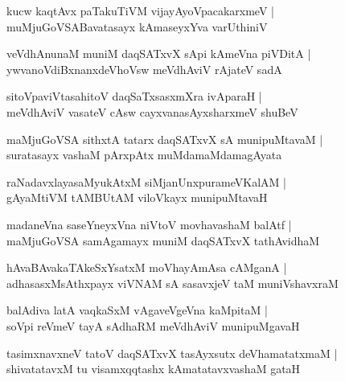 \documentclass[twoside,12pt,openright]{book}
\newcounter{shloka}[chapter]
\begin{document}
\begin{shloka}%
kucw kaqtAvx paTakuTiVM vijayAyoVpacakarxmeV |\\
muMjuGoVSABavatasayx kAmaseyxYva varUthiniV 
\end{shloka}

\begin{shloka}%
veVdhAnunaM muniM daqSATxvX sApi kAmeVna piVDitA |\\
ywvanoVdiBxnanxdeVhoVsw meVdhAviV rAjateV sadA
\end{shloka}

\begin{shloka}%
sitoVpaviVtasahitoV daqSaTxsasxmXra ivAparaH |\\
meVdhAviV vasateV cAsw cayxvanasAyxsharxmeV shuBeV
\end{shloka}

\begin{shloka}%
maMjuGoVSA sithxtA tatarx daqSATxvX sA munipuMtavaM |\\
suratasayx vashaM pArxpAtx muMdamaMdamagAyata
\end{shloka}

\begin{shloka}%
raNadavxlayasaMyukAtxM siMjanUnxpurameVKalAM |\\
gAyaMtiVM tAMBUtAM viloVkayx munipuMtavaH 
\end{shloka}

\begin{shloka}%
madaneVna saseYneyxVna niVtoV movhavashaM balAtf |\\
maMjuGoVSA samAgamayx muniM daqSATxvX tathAvidhaM 
\end{shloka}

\begin{shloka}%
hAvaBAvakaTAkeSxYsatxM moVhayAmAsa cAMganA |\\
adhasasxMsAthxpayx viVNAM sA sasavxjeV taM muniVshavxraM 
\end{shloka}

\begin{shloka}%
balAdiva latA vaqkaSxM vAgaveVgeVna kaMpitaM |\\
soVpi reVmeV tayA sAdhaRM meVdhAviV munipuMgavaH 
\end{shloka}

\begin{shloka}%
tasimxnavxneV tatoV daqSATxvX tasAyxsutx deVhamatatxmaM |\\
shivatatavxM tu visamxqqtashx kAmatatavxvashaM gataH 
\end{shloka}
\end{document}
